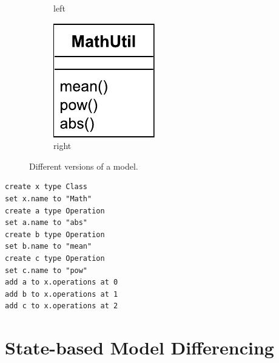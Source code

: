 \begin{figure}[H]
\begin{subfigure}[t]{0.2\linewidth}
        \caption{left}
        \label{fig:left}
    \end{subfigure}
    \hfill
    \begin{subfigure}[t]{0.2\linewidth}
        \centering
        \includegraphics[width=\linewidth]{RightClassDiagram}
        \caption{right}
        \label{fig:right}
    \end{subfigure}
    \hfill
    \label{fig:versions}
    \caption{Different versions of a model.}
\end{figure}

\begin{lstlisting}[style=eol,caption={The pseudo-formatted CBP of the model in Fig. \ref{fig:origin}.},label=lst:origincbp]
create x type Class
set x.name to "Math" 
create a type Operation
set a.name to "abs" 
create b type Operation
set b.name to "mean" 
create c type Operation
set c.name to "pow" 
add a to x.operations at 0
add b to x.operations at 1
add c to x.operations at 2
\end{lstlisting}

\vspace{-5pt}
\section{State-based Model Differencing}
\label{sec:model_differencing}

